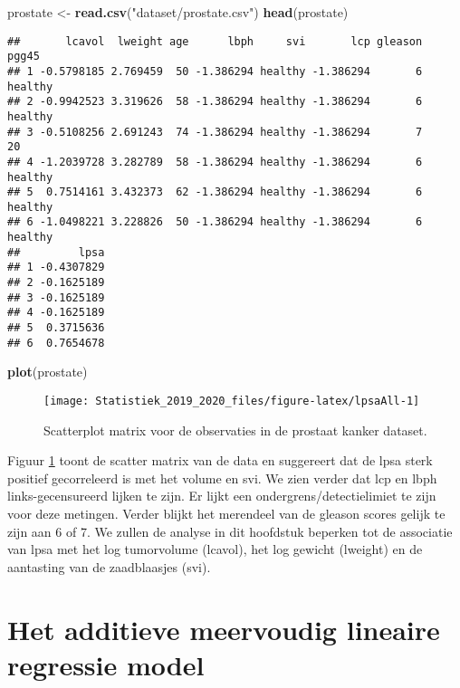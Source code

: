 \documentclass[12pt,dutch,coursenotes]{book}
\newenvironment{Shaded}{\begin{snugshade}}{\end{snugshade}}
\newcommand{\KeywordTok}[1]{\textcolor[rgb]{0.13,0.29,0.53}{\textbf{#1}}}
\newcommand{\StringTok}[1]{\textcolor[rgb]{0.31,0.60,0.02}{#1}}
\newcommand{\NormalTok}[1]{#1}
\theoremstyle{definition}
\theoremstyle{definition}
\theoremstyle{definition}
\theoremstyle{remark}
\begin{document}
\begin{Shaded}
\begin{Highlighting}[]
\NormalTok{prostate <-}\StringTok{ }\KeywordTok{read.csv}\NormalTok{(}\StringTok{"dataset/prostate.csv"}\NormalTok{)}
\KeywordTok{head}\NormalTok{(prostate)}
\end{Highlighting}
\end{Shaded}

\begin{verbatim}
##       lcavol  lweight age      lbph     svi       lcp gleason   pgg45
## 1 -0.5798185 2.769459  50 -1.386294 healthy -1.386294       6 healthy
## 2 -0.9942523 3.319626  58 -1.386294 healthy -1.386294       6 healthy
## 3 -0.5108256 2.691243  74 -1.386294 healthy -1.386294       7      20
## 4 -1.2039728 3.282789  58 -1.386294 healthy -1.386294       6 healthy
## 5  0.7514161 3.432373  62 -1.386294 healthy -1.386294       6 healthy
## 6 -1.0498221 3.228826  50 -1.386294 healthy -1.386294       6 healthy
##         lpsa
## 1 -0.4307829
## 2 -0.1625189
## 3 -0.1625189
## 4 -0.1625189
## 5  0.3715636
## 6  0.7654678
\end{verbatim}

\begin{Shaded}
\begin{Highlighting}[]
\KeywordTok{plot}\NormalTok{(prostate)}
\end{Highlighting}
\end{Shaded}

\begin{figure}

{\centering \texttt{[image: Statistiek\_2019\_2020\_files/figure-latex/lpsaAll-1]} 

}

\caption{Scatterplot matrix voor de observaties in de prostaat kanker dataset.}\label{fig:lpsaAll}
\end{figure}

Figuur \ref{fig:lpsaAll} toont de scatter matrix van de data en
suggereert dat de lpsa sterk positief gecorreleerd is met het volume en
svi. We zien verder dat lcp en lbph links-gecensureerd lijken te zijn.
Er lijkt een ondergrens/detectielimiet te zijn voor deze metingen.
Verder blijkt het merendeel van de gleason scores gelijk te zijn aan 6
of 7. We zullen de analyse in dit hoofdstuk beperken tot de associatie
van lpsa met het log tumorvolume (lcavol), het log gewicht (lweight) en
de aantasting van de zaadblaasjes (svi).

\section{Het additieve meervoudig lineaire regressie
model}\label{het-additieve-meervoudig-lineaire-regressie-model}
\end{document}
